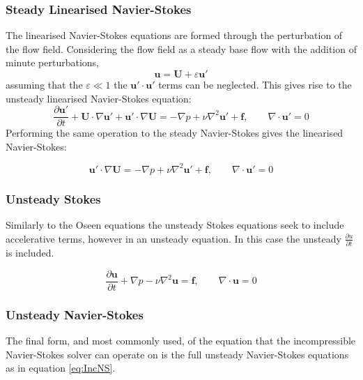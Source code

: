 \documentclass[11pt, a4paper]{report}
\begin{document}
\subsubsection{Steady Linearised Navier-Stokes}
The linearised Navier-Stokes equations are formed through the perturbation of the flow field. Considering the flow field as a steady base flow with the addition of minute perturbations,
\begin{equation}
\mathbf{u} = \mathbf{U} + \varepsilon\mathbf{u'}
\end{equation}
assuming that the $\varepsilon \ll 1$ the $\mathbf{u'} \cdot \mathbf{u'}$ terms can be neglected. This gives rise to the unsteady linearised Navier-Stokes equation:
\begin{equation}
\frac{\partial \mathbf{u'}}{\partial t} + \mathbf{U} \cdot \nabla \mathbf{u'} + \mathbf{u'} \cdot \nabla \mathbf{U} = - \nabla p + \nu  \nabla^{2} \mathbf{u'} + \mathbf{f}, \qquad \nabla\cdot\mathbf{u'} = 0
\label{eq:UnsteadyLinearisedNS}
\end{equation}
Performing the same operation to the steady Navier-Stokes gives the linearised Navier-Stokes:

\begin{equation}
\mathbf{u'} \cdot \nabla \mathbf{U} = - \nabla p + \nu  \nabla^{2} \mathbf{u'} + \mathbf{f}, \qquad \nabla\cdot\mathbf{u'} = 0
\label{eq:SteadyLinearisedNS}
\end{equation}

\subsubsection{Unsteady Stokes}
Similarly to the Oseen equations the unsteady Stokes equations seek to include accelerative terms, however in an unsteady equation. In this case the unsteady $\frac{\partial u}{\partial t}$ is included.

\begin{equation}
\frac{\partial \mathbf{u}}{\partial t} + \nabla p - \nu \nabla^{2} \mathbf{u} = \mathbf{f}, \qquad \nabla \cdot \mathbf{u} = 0
\label{eq:UnsteadyStokes}
\end{equation}

\subsubsection{Unsteady Navier-Stokes}
The final form, and most commonly used, of the equation that the incompressible Navier-Stokes solver can operate on is the full unsteady Navier-Stokes equations as in equation \ref{eq:IncNS}.
		
\end{document}
